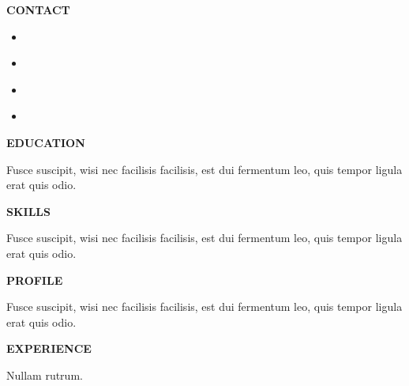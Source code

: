\documentclass{article}
\renewcommand{\section}[2][L]{
  \ifthenelse{\equal{#1}{L}}{\RaggedLeft}{\RaggedRight}
  \normalfont\Large\bfseries
  {#2}
  \vspace{-10pt}\newline{\hrulefill}\normalfont\newline
}
\newcommand{\headerNameStyle}[1]{\fontsize{28pt}{1em}\MakeUppercase{\nameFont{#1}}}
\begin{document}
    \begin{minipage}[c]{\linewidth}
      \RaggedLeft{\headerNameStyle{\myName}}\newline
      \RaggedLeft{\MakeUppercase\myTagline}
    \end{minipage}
    \vspace{2cm}

    \begin{minipage}[c]{0.3\linewidth}
      \section[L]{CONTACT}
      \begin{itemize}[label=,topsep=8pt,itemsep=4pt,partopsep=4pt, parsep=4pt]
              \RaggedLeft
              \small
        \item\href{mailto:\myEmail}{\myEmail\hspace{10pt}\faEnvelope}
        \item\href{https://\myWeb}{\myWeb\hspace{10pt}\faHome}
        \item\href{https://www.linkedin.com/in/\myLinkedin}{\myLinkedin\hspace{10pt}\faLinkedin}
        \item\href{https://\myWeb}{\myGithub\hspace{10pt}\faGithub}
      \end{itemize}

      \section[L]{EDUCATION}
      Fusce suscipit, wisi nec facilisis facilisis, est dui fermentum leo, quis tempor ligula erat quis odio.

      \section[L]{SKILLS}
      Fusce suscipit, wisi nec facilisis facilisis, est dui fermentum leo, quis tempor ligula erat quis odio.

    \end{minipage}
    \hspace{0.5cm}
    \vrule
    \hspace{0.5cm}
    \begin{minipage}[c]{0.6\linewidth}
      \section[R]{PROFILE}
      Fusce suscipit, wisi nec facilisis facilisis, est dui fermentum leo, quis tempor ligula erat quis odio.

      \section[R]{EXPERIENCE}
      Nullam rutrum.
    \end{minipage}
\end{document}
